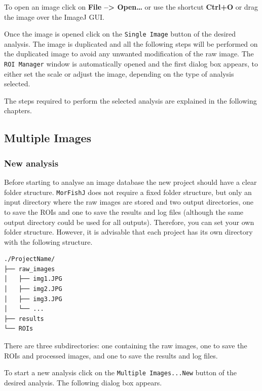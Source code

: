 \documentclass[
  letterpaper,
  DIV=11,
  numbers=noendperiod,
  oneside]{scrreprt}
\begin{document}
To open an image click on \textbf{File --\textgreater{} Open\ldots{}} or
use the shortcut \textbf{Ctrl+O} or drag the image over the ImageJ GUI.

Once the image is opened click on the \texttt{Single\ Image} button of
the desired analysis. The image is duplicated and all the following
steps will be performed on the duplicated image to avoid any unwanted
modification of the raw image. The \texttt{ROI\ Manager} window is
automatically opened and the first dialog box appears, to either set the
scale or adjust the image, depending on the type of analysis selected.

The steps required to perform the selected analysis are explained in the
following chapters.

\hypertarget{multiple-images}{%
\subsection{Multiple Images}\label{multiple-images}}

\hypertarget{new-analysis}{%
\subsubsection*{New analysis}\label{new-analysis}}

Before starting to analyse an image database the new project should have
a clear folder structure. \texttt{MorFishJ} does not require a fixed
folder structure, but only an input directory where the raw images are
stored and two output directories, one to save the ROIs and one to save
the results and log files (although the same output directory could be
used for all outputs). Therefore, you can set your own folder structure.
However, it is advisable that each project has its own directory with
the following structure.

\begin{verbatim}
./ProjectName/
├── raw_images
│   ├── img1.JPG
│   ├── img2.JPG
│   ├── img3.JPG
│   └── ...
├── results
└── ROIs
\end{verbatim}

There are three subdirectories: one containing the raw images, one to
save the ROIs and processed images, and one to save the results and log
files.

To start a new analysis click on the \texttt{Multiple\ Images...New}
button of the desired analysis. The following dialog box appears.
\end{document}
